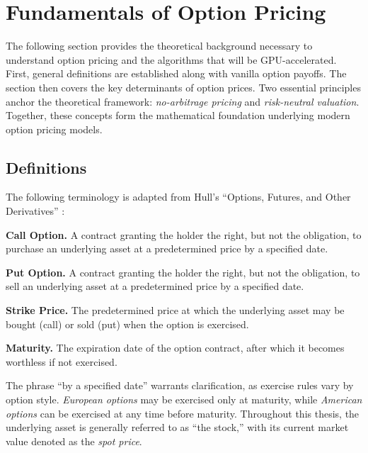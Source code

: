\documentclass[english,12pt,a4paper,pdftex,sci,utf8]{aaltothesis}
\begin{document}
\clearpage

\section{Fundamentals of Option Pricing} \label{sec:theory}

The following section provides the theoretical background necessary to understand option pricing and the algorithms that will be GPU-accelerated. First, general definitions are established along with vanilla option payoffs. The section then covers the key determinants of option prices. Two essential principles anchor the theoretical framework: \emph{no-arbitrage pricing} and \emph{risk-neutral valuation}. Together, these concepts form the mathematical foundation underlying modern option pricing models.

\subsection{Definitions}\label{subsec:definitions}
The following terminology is adapted from Hull's ``Options, Futures, and Other Derivatives'' \cite{hull2016options}:

\vspace{0.5\baselineskip}
\noindent\textbf{Call Option.} A contract granting the holder the right, but not the obligation, to purchase an underlying asset at a predetermined price by a specified date.

\vspace{0.5\baselineskip}
\noindent\textbf{Put Option.} A contract granting the holder the right, but not the obligation, to sell an underlying asset at a predetermined price by a specified date.

\vspace{0.5\baselineskip}
\noindent\textbf{Strike Price.} The predetermined price at which the underlying asset may be bought (call) or sold (put) when the option is exercised.

\vspace{0.5\baselineskip}
\noindent\textbf{Maturity.} The expiration date of the option contract, after which it becomes worthless if not exercised.

\vspace{\baselineskip}
\noindent The phrase ``by a specified date'' warrants clarification, as exercise rules vary by option style. \emph{European options} may be exercised only at maturity, while \emph{American options} can be exercised at any time before maturity. Throughout this thesis, the underlying asset is generally referred to as ``the stock,'' with its current market value denoted as the \emph{spot price}.
\end{document}

